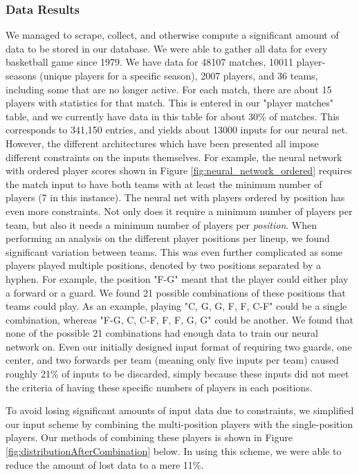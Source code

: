 \subsubsection{Data Results}
We managed to scrape, collect, and otherwise compute a significant amount of data to be stored in our database. We were able to gather all data for every basketball game since 1979. We have data for 48107 matches, 10011 player-seasons (unique players for a specific season), 2007 players, and 36 teams, including some that are no longer active. For each match, there are about 15 players with statistics for that match. This is entered in our "player matches" table, and we currently have data in this table for about 30\% of matches. This corresponds to 341,150 entries, and yields about 13000 inputs for our neural net. However, the different architectures which have been presented all impose different constraints on the inputs themselves. For example, the neural network with ordered player scores shown in Figure \ref{fig:neural_network_ordered} requires the match input to have both teams with at least the minimum number of  players (7 in this instance). The neural net with players ordered by position has even more constraints. Not only does it require a minimum number of players per team, but also it needs a minimum number of players per \textit{position}. When performing an analysis on the different player positions per lineup, we found significant variation between teams. This was even further complicated as some players played multiple positions, denoted by two positions separated by a hyphen. For example, the position "F-G" meant that the player could either play a forward or a guard. We found 21 possible combinations of these positions that teams could play. As an example, playing "C, G, G, F, F, C-F" could be a single combination, whereas "F-G, C, C-F, F, F, G, G" could be another. We found that none of the possible 21 combinations had enough data to train our neural network on. Even our initially designed input format of requiring two guards, one center, and two forwards per team (meaning only five inputs per team) caused roughly 21\% of inputs to be discarded, simply because these inputs did not meet the criteria of having these specific numbers of players in each positions.

To avoid losing significant amounts of input data due to constraints, we simplified our input scheme by combining the multi-position players with the single-position players. Our methods of combining these players is shown in Figure \ref{fig:distributionAfterCombination} below. In using this scheme, we were able to reduce the amount of lost data to a mere 11\%.

